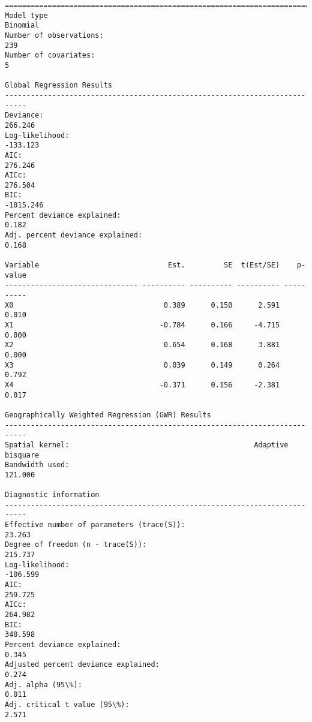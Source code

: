 \documentclass[11pt]{article}
\begin{document}
    \begin{Verbatim}[commandchars=\\\{\}]
===========================================================================
Model type                                                         Binomial
Number of observations:                                                 239
Number of covariates:                                                     5

Global Regression Results
---------------------------------------------------------------------------
Deviance:                                                           266.246
Log-likelihood:                                                    -133.123
AIC:                                                                276.246
AICc:                                                               276.504
BIC:                                                              -1015.246
Percent deviance explained:                                           0.182
Adj. percent deviance explained:                                      0.168

Variable                              Est.         SE  t(Est/SE)    p-value
------------------------------- ---------- ---------- ---------- ----------
X0                                   0.389      0.150      2.591      0.010
X1                                  -0.784      0.166     -4.715      0.000
X2                                   0.654      0.168      3.881      0.000
X3                                   0.039      0.149      0.264      0.792
X4                                  -0.371      0.156     -2.381      0.017

Geographically Weighted Regression (GWR) Results
---------------------------------------------------------------------------
Spatial kernel:                                           Adaptive bisquare
Bandwidth used:                                                     121.000

Diagnostic information
---------------------------------------------------------------------------
Effective number of parameters (trace(S)):                           23.263
Degree of freedom (n - trace(S)):                                   215.737
Log-likelihood:                                                    -106.599
AIC:                                                                259.725
AICc:                                                               264.982
BIC:                                                                340.598
Percent deviance explained:                                         0.345
Adjusted percent deviance explained:                                0.274
Adj. alpha (95\%):                                                     0.011
Adj. critical t value (95\%):                                          2.571


\end{Verbatim}
\end{document}
